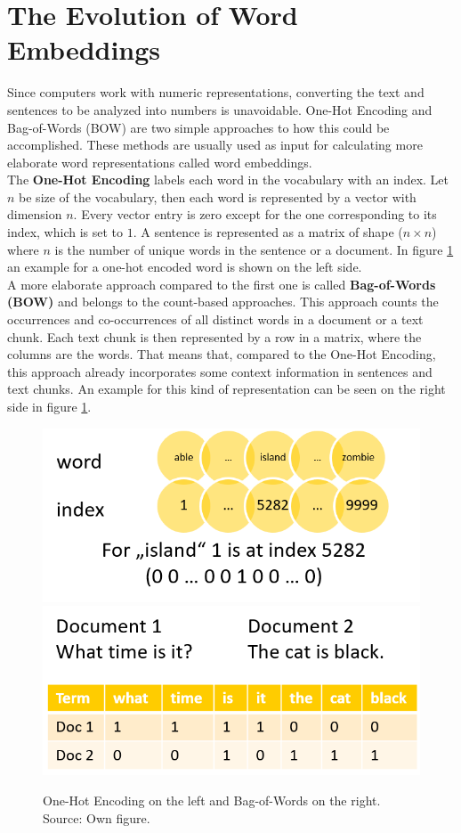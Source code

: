 \documentclass[]{krantz}
\begin{document}
\hypertarget{the-evolution-of-word-embeddings}{%
\section{The Evolution of Word Embeddings}\label{the-evolution-of-word-embeddings}}

Since computers work with numeric representations, converting the text and sentences to be analyzed into numbers is unavoidable. One-Hot Encoding and Bag-of-Words (BOW) are two simple approaches to how this could be accomplished. These methods are usually used as input for calculating more elaborate word representations called word embeddings.\\
The \textbf{One-Hot Encoding} labels each word in the vocabulary with an index. Let \(n\) be size of the vocabulary, then each word is represented by a vector with dimension \(n\). Every vector entry is zero except for the one corresponding to its index, which is set to \(1\). A sentence is represented as a matrix of shape (\(n\times n\)) where \(n\) is the number of unique words in the sentence or a document. In figure \ref{fig:onehot-bow-01-01} an example for a one-hot encoded word is shown on the left side.\\
A more elaborate approach compared to the first one is called \textbf{Bag-of-Words (BOW)} and belongs to the count-based approaches. This approach counts the occurrences and co-occurrences of all distinct words in a document or a text chunk. Each text chunk is then represented by a row in a matrix, where the columns are the words. That means that, compared to the One-Hot Encoding, this approach already incorporates some context information in sentences and text chunks. An example for this kind of representation can be seen on the right side in figure \ref{fig:onehot-bow-01-01}.

\begin{figure}
\includegraphics[width=0.5\linewidth]{figures/01-01-foundations-applications-of-modern-NLP/01-01_one-hot} \includegraphics[width=0.5\linewidth]{figures/01-01-foundations-applications-of-modern-NLP/01-01_bow} \caption{One-Hot Encoding on the left and Bag-of-Words on the right. Source: Own figure.}\label{fig:onehot-bow-01-01}
\end{figure}
\end{document}
